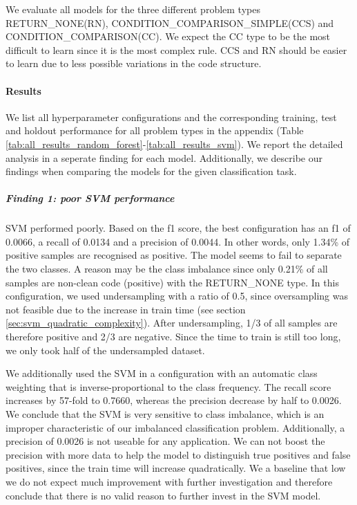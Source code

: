 We evaluate all models for the three different problem types RETURN\_NONE(RN), CONDITION\_COMPARISON\_SIMPLE(CCS) and CONDITION\_COMPARISON(CC). We expect the CC type to be the most difficult to learn since it is the most complex rule. CCS and RN should be easier to learn due to less possible  variations in the code structure.

\paragraph{Results}
We list all hyperparameter configurations and the corresponding training, test and holdout performance for all problem types in the appendix (Table \ref{tab:all_results_random_forest}-\ref{tab:all_results_svm}). We report the detailed analysis in a seperate finding for each model. Additionally, we describe our findings when comparing the models for the given classification task.



\subparagraph{Finding 1: poor SVM performance}
SVM performed poorly. Based on the f1 score, the best configuration has an f1 of 0.0066, a recall of 0.0134 and a precision of 0.0044. In other words, only 1.34\% of positive samples are recognised as positive. The model seems to fail to separate the two classes. A reason may be the class imbalance since only 0.21\% of all samples are non-clean code (positive) with the RETURN\_NONE type. In this configuration, we used undersampling with a ratio of 0.5, since oversampling was not feasible due to the increase in train time (see section \ref{sec:svm_quadratic_complexity}). After undersampling, 1/3 of all samples are therefore positive and 2/3 are negative. Since the time to train is still too long, we only took half of the undersampled dataset. 

We additionally used the SVM in a configuration with an automatic class weighting that is inverse-proportional to the class frequency. The recall score increases by 57-fold to 0.7660, whereas the precision decrease by half to 0.0026. We conclude that the SVM is very sensitive to class imbalance, which is an improper characteristic of our imbalanced classification problem. Additionally, a precision of 0.0026 is not useable for any application. We can not boost the precision with more data to help the model to distinguish true positives and false positives, since the train time will increase quadratically. We a baseline that low we do not expect much improvement with further investigation and therefore conclude that there is no valid reason to further invest in the SVM model.


